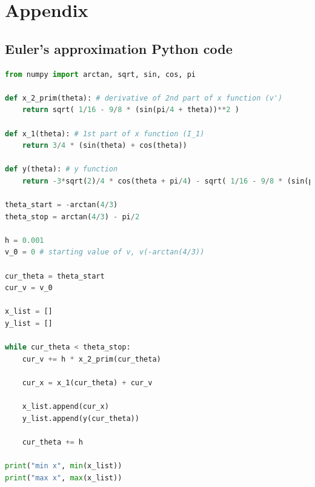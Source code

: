 \documentclass[12pt]{article}
\begin{document}
    \newpage
    
    

    \newpage
    \section*{Appendix}
    \appendix
    \renewcommand{\thesubsection}{\Alph{subsection}}

    \subsection{Euler's approximation Python code}\label{app:euler_python}

    \begin{onehalfspace}
        
    \begin{lstlisting}[language=python]
from numpy import arctan, sqrt, sin, cos, pi

def x_2_prim(theta): # derivative of 2nd part of x function (v')
    return sqrt( 1/16 - 9/8 * (sin(pi/4 + theta))**2 )

def x_1(theta): # 1st part of x function (I_1)
    return 3/4 * (sin(theta) + cos(theta))

def y(theta): # y function
    return -3*sqrt(2)/4 * cos(theta + pi/4) - sqrt( 1/16 - 9/8 * (sin(pi/4 + theta))**2 )

theta_start = -arctan(4/3)
theta_stop = arctan(4/3) - pi/2 

h = 0.001
v_0 = 0 # starting value of v, v(-arctan(4/3))

cur_theta = theta_start
cur_v = v_0

x_list = []
y_list = []

while cur_theta < theta_stop:    
    cur_v += h * x_2_prim(cur_theta)
    
    cur_x = x_1(cur_theta) + cur_v
    
    x_list.append(cur_x)
    y_list.append(y(cur_theta))

    cur_theta += h

print("min x", min(x_list))
print("max x", max(x_list))\end{lstlisting}

    \end{onehalfspace}
\end{document}
